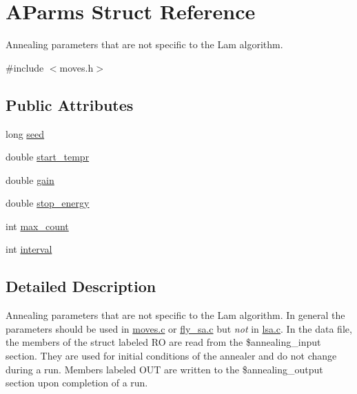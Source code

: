 \hypertarget{structAParms}{
\section{AParms Struct Reference}
\label{structAParms}
}


Annealing parameters that are not specific to the Lam algorithm.  


{\ttfamily \#include $<$moves.h$>$}\subsection*{Public Attributes}
\begin{DoxyCompactItemize}
\item 
long \hyperlink{structAParms_a7d69899585ac92b3045262f10cf3ed31}{seed}
\item 
double \hyperlink{structAParms_a012f0843a73cde4e53d40656ac280276}{start\_\-tempr}
\item 
double \hyperlink{structAParms_a6a943f20f9124e8ce88d43c80fab2ed2}{gain}
\item 
double \hyperlink{structAParms_a9ddd20061cfb023dc042adcc611c26cf}{stop\_\-energy}
\item 
int \hyperlink{structAParms_a48486c83137ebc42a2970b33a84cbfc6}{max\_\-count}
\item 
int \hyperlink{structAParms_a625153becccab120e5f0518ac2a855f4}{interval}
\end{DoxyCompactItemize}


\subsection{Detailed Description}
Annealing parameters that are not specific to the Lam algorithm. In general the parameters should be used in \hyperlink{moves_8c}{moves.c} or \hyperlink{fly__sa_8c}{fly\_\-sa.c} but {\itshape not\/} in \hyperlink{lsa_8c}{lsa.c}. In the data file, the members of the struct labeled RO are read from the \$annealing\_\-input section. They are used for initial conditions of the annealer and do not change during a run. Members labeled OUT are written to the \$annealing\_\-output section upon completion of a run. 

